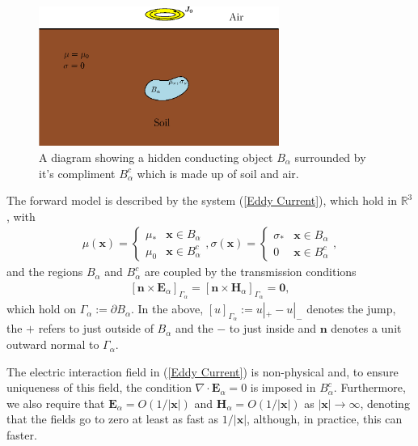 \begin{figure}[H]
\begin{center}
\includegraphics[width=0.7\textwidth, keepaspectratio]{Figures/MetalDetectionSoilSmall.eps}
\caption{A diagram showing a hidden conducting object $B_{\alpha}$ surrounded by it's compliment $B_{\alpha}^c$ which is made up of soil and air.}
\label{metal detection}
\end{center}
\end{figure}
The forward model is described by the system (\ref{Eddy Current}),  which hold in ${\mathbb R}^3$, with
\begin{align}
\mu (\bm{x}) = \left \{  \begin{array}{ll} \mu_* & \bm{x} \in B_{\alpha} \\
\mu_0 & \bm{x} \in B_{\alpha}^c \end{array} \right . ,
\sigma (\bm{x}) = \left \{  \begin{array}{ll} \sigma_* & \bm{x} \in B_{\alpha} \\
0 & \bm{x} \in B_{\alpha}^c \end{array} \right .,
\end{align}
and the regions $B_\alpha$  and $B_\alpha^c $ are coupled by the transmission conditions
\begin{align}
\left [\bm{n} \times \bm{E}_\alpha\right ]_{\Gamma_{\alpha}}=\left [\bm{n} \times \bm{H}_\alpha\right ]_{\Gamma_{\alpha}}=\bm{0},\label{jump}
\end{align}
\noindent
which hold on  $\Gamma_\alpha:= \partial B_\alpha$. In the above, $[u ]_{\Gamma_{\alpha}}:= u| _+ - u|_-  $ denotes the jump,  the $+$ refers to just outside of $B_\alpha$ and the $-$ to just inside and $\bm{n}$ denotes a unit outward normal to  $\Gamma_{\alpha}$. 

The electric interaction field in  (\ref{Eddy Current}) is non-physical and, to ensure uniqueness of this field, the condition $\nabla \cdot \bm{E}_\alpha =0$ is imposed in $B_\alpha^c$. Furthermore,  we also require that $\bm{E}_{\alpha}=O(1/|\bm{x}|)$ and $\bm{H}_{\alpha}=O(1/|\bm{x}|)$  as $|\bm{x} | \to \infty$, denoting that the fields go to zero at least as fast as $1/|\bm{x}|$, although, in practice, this can faster.


